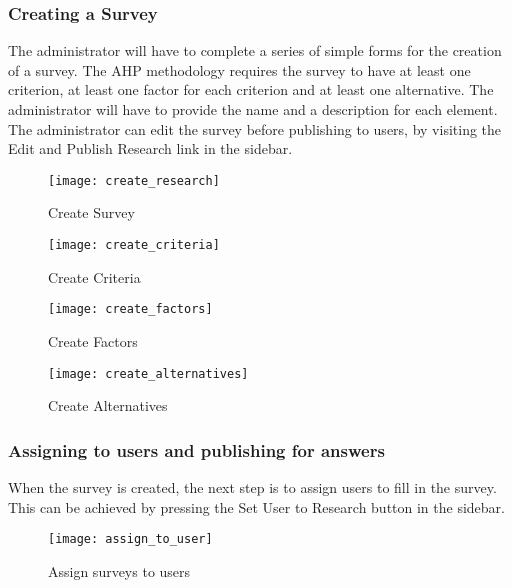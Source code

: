 \documentclass{article}
\begin{document}
\subsubsection*{Creating a Survey}

The administrator will have to complete a series of simple forms for the creation of a survey. The AHP methodology requires the survey to have at least one criterion, at least one factor for each criterion and at least one alternative. The administrator will have to provide the name and a description for each element. The administrator can edit the survey before publishing to users, by visiting the Edit and Publish Research link in the sidebar.

\begin{figure}[h!]
\centering
\texttt{[image: create\_research]}
\caption{Create Survey}
\label{fig:create_survey}
\end{figure}

\begin{figure}[h!]
\centering
\texttt{[image: create\_criteria]}
\caption{Create Criteria}
\label{fig:create_criteria}
\end{figure}

\begin{figure}[h!]
\centering
\texttt{[image: create\_factors]}
\caption{Create Factors}
\label{fig:create_factors}
\end{figure}

\begin{figure}[h!]
\centering
\texttt{[image: create\_alternatives]}
\caption{Create Alternatives}
\label{fig:create_alternatives}
\end{figure}





\subsubsection*{Assigning to users and publishing for answers}

When the survey is created, the next step is to assign users to fill in the survey. This can be achieved by pressing the Set User to Research button in the sidebar.





\begin{figure}[h!]
\centering
\texttt{[image: assign\_to\_user]}
\caption{Assign surveys to users}
\label{fig:assign_surveys}
\end{figure}
\end{document}
